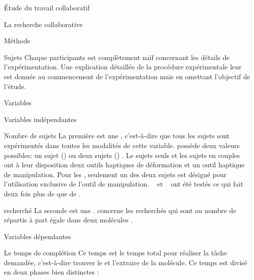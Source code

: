 \documentclass[myfrancais]{mythesis}
\begin{document}
\begin{mypart}{Étude du travail collaboratif}
\begin{mychapter}{La recherche collaborative}
\begin{mysection}{Méthode}
\begin{mysubsection}{Sujets}
					Chaque participants est complètement naïf concernant les détails de l'expérimentation.
					Une explication détaillée de la procédure expérimentale leur est donnée au commencement de l'expérimentation mais en omettant l'objectif de l'étude.
				\end{mysubsection}
				\begin{mysubsection}{Variables}
					\begin{mysubsubsection}{Variables indépendantes}
						\begin{myparagraph}{ Nombre de sujets}
							La première  est une , c'est-à-dire que tous les sujets sont expérimentés dans toutes les modalités de cette variable.
							 possède deux valeurs possibles: \og un sujet (\mycf {}) \fg ou \og deux sujets (\mycf {}) \fg.
							Le sujets seuls et les sujets en couples ont à leur disposition deux outils haptiques de déformation et un outil haptique de manipulation.
							Pour les , seulement un des deux sujets est désigné pour l'utilisation exclusive de l'outil de manipulation.
							~ et ~ ont été testés ce qui fait deux fois plus de  que de .
						\end{myparagraph}
						\begin{myparagraph}{  recherché}
							La seconde  est une .
							 concerne les  recherchés qui sont au nombre de  répartis à part égale dans deux molécules .
						\end{myparagraph}
					\end{mysubsubsection}
					\begin{mysubsubsection}{Variables dépendantes}
						\begin{myparagraph}{ Le temps de complétion}
							Ce temps est le temps total pour réaliser la tâche demandée, c'est-à-dire trouver le  et l'extraire de la molécule.
							Ce temps est divisé en deux phases bien distinctes :
							\begin{description}

\end{description}
\end{myparagraph}
\end{mysubsubsection}
\end{mysubsection}
\end{mysection}
\end{mychapter}
\end{mypart}
\end{document}
